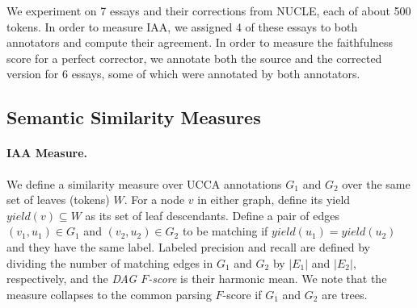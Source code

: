 \documentclass[letter,11pt]{article}
\begin{document}
We experiment on 7 essays and their corrections from NUCLE, each of about 500 tokens.
In order to measure IAA, we assigned 4 of these essays to both annotators
and compute their agreement.
In order to measure the faithfulness score for a perfect corrector, we annotate both
the source and the corrected version for 6 essays, some of which were annotated by both annotators.
%
%
%
%
%
\subsection{Semantic Similarity Measures}
\paragraph{IAA Measure.} We define a similarity measure over UCCA annotations 
$G_1$ and $G_2$ over the same set of leaves (tokens) $W$.
For a node $v$ in either graph, define its yield $yield(v) \subseteq W$ as its
set of leaf descendants.
Define a pair of edges $(v_1,u_1) \in G_1$ and $(v_2,u_2) \in G_2$ to be matching
if $yield(u_1) = yield(u_2)$ and they have the same label.
Labeled precision and recall are defined by dividing the number of matching edges
in $G_1$ and $G_2$ by $|E_1|$ and $|E_2|$, respectively, and
the {\it DAG $F$-score} is their harmonic mean.
We note that the measure collapses to the common parsing $F$-score if $G_1$ and $G_2$ are trees.
\end{document}
